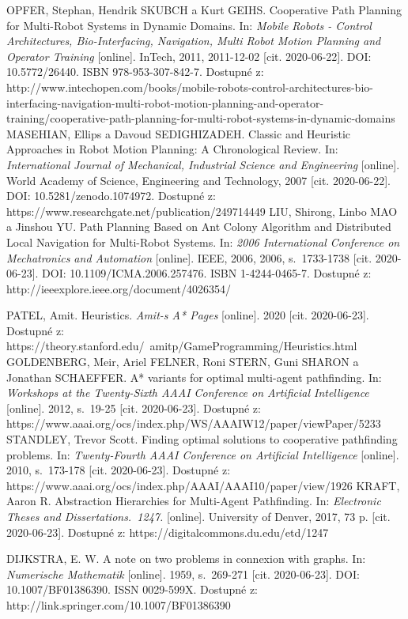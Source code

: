 \begin{thebibliography}{99}
OPFER, Stephan, Hendrik SKUBCH a Kurt GEIHS. Cooperative Path Planning for Multi-Robot Systems in Dynamic Domains. In: \textit{Mobile Robots - Control Architectures, Bio-Interfacing, Navigation, Multi Robot Motion Planning and Operator Training} [online]. InTech, 2011, 2011-12-02 [cit. 2020-06-22]. DOI: 10.5772/26440. ISBN 978-953-307-842-7. Dostupné z: http://www.intechopen.com/books/mobile-robots-control-architectures-bio-interfacing-navigation-multi-robot-motion-planning-and-operator-training/cooperative-path-planning-for-multi-robot-systems-in-dynamic-domains
MASEHIAN, Ellips a Davoud SEDIGHIZADEH. Classic and Heuristic Approaches in Robot Motion Planning: A Chronological Review. In: \textit{International Journal of Mechanical, Industrial Science and Engineering} [online]. World Academy of Science, Engineering and Technology, 2007 [cit. 2020-06-22]. DOI: 10.5281/zenodo.1074972. Dostupné z: https://www.researchgate.net/publication/249714449
LIU, Shirong, Linbo MAO a Jinshou YU. Path Planning Based on Ant Colony Algorithm and Distributed Local Navigation for Multi-Robot Systems. In: \textit{2006 International Conference on Mechatronics and Automation} [online]. IEEE, 2006, 2006, s.~1733-1738 [cit. 2020-06-23]. DOI: 10.1109/ICMA.2006.257476. ISBN 1-4244-0465-7. Dostupné z: http://ieeexplore.ieee.org/document/4026354/
	
PATEL, Amit. Heuristics. \textit{Amit-s A* Pages} [online]. 2020 [cit. 2020-06-23]. Dostupné z: https://theory.stanford.edu/~amitp/GameProgramming/Heuristics.html
GOLDENBERG, Meir, Ariel FELNER, Roni STERN, Guni SHARON a Jonathan SCHAEFFER. A* variants for optimal multi-agent pathfinding. In: \textit{Workshops at the Twenty-Sixth AAAI Conference on Artificial Intelligence} [online]. 2012, s.~19-25 [cit. 2020-06-23]. Dostupné z: https://www.aaai.org/ocs/index.php/WS/AAAIW12/paper/viewPaper/5233
STANDLEY, Trevor Scott. Finding optimal solutions to cooperative pathfinding problems. In: \textit{Twenty-Fourth AAAI Conference on Artificial Intelligence} [online]. 2010, s.~173-178 [cit. 2020-06-23]. Dostupné z: https://www.aaai.org/ocs/index.php/AAAI/AAAI10/paper/view/1926
KRAFT, Aaron R. Abstraction Hierarchies for Multi-Agent Pathfinding. In: \textit{Electronic Theses and Dissertations.~1247.} [online]. University of Denver, 2017, 73 p. [cit. 2020-06-23]. Dostupné z: https://digitalcommons.du.edu/etd/1247

DIJKSTRA, E. W. A note on two problems in connexion with graphs. In: \textit{Numerische Mathematik} [online]. 1959, s.~269-271 [cit. 2020-06-23]. DOI: 10.1007/BF01386390. ISSN 0029-599X. Dostupné z: http://link.springer.com/10.1007/BF01386390
	
	
\end{thebibliography}